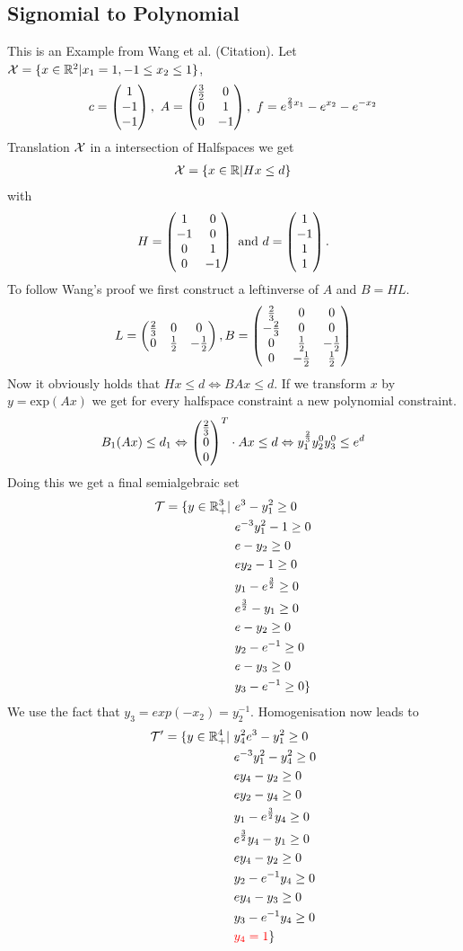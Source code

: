 \documentclass[./main.tex]{subfiles}
\begin{document}
\subsection{Signomial to Polynomial}
This is an Example from Wang et al. (Citation). Let $\mathcal X = \lbrace x \in \mathbb{R}^2 | x_1 = 1, -1\leq x_2 \leq 1 \rbrace$, 
\begin{equation*}
c = \begin{pmatrix}1\\-1\\-1\end{pmatrix}, \ A =  \begin{pmatrix} \frac 3 2 & 0 \\ 0 & 1 \\ 0 & -1 \end{pmatrix}, \ f=e^{\frac 2 3 x_1} - e^{x_2} - e^{-x_2}
\end{equation*}
Translation $\mathcal{X}$ in a intersection of Halfspaces we get
\begin{align*}
\mathcal{X} = \lbrace x \in \mathbb{R} \vert Hx \leq d \rbrace
\end{align*}
with
\begin{align*}
H =  \begin{pmatrix} 1 & 0 \\ -1 & 0 \\ 0 & 1 \\ 0 & -1 \end{pmatrix} \text{ and } d = \begin{pmatrix}1\\-1\\1\\1\end{pmatrix}.
\end{align*}
To follow Wang's proof we first construct a leftinverse of $A$ and $B=HL$.
\begin{align*}
L = \begin{pmatrix} \frac 2 3 & 0 & 0 \\ 0 & \frac 1 2 & -\frac 1 2 \\ \end{pmatrix}, B = \begin{pmatrix} \frac 2 3 & 0 & 0 \\ -\frac 2 3 & 0 & 0 \\ 0 & \frac 1 2 & -\frac 1 2 \\ 0 & -\frac 1 2 & \frac 1 2 \\ \end{pmatrix}
\end{align*}
Now it obviously holds that $Hx \leq d  \Leftrightarrow BAx \leq d$. If we transform $x$ by $y=\text{exp}(Ax)$ we get for every halfspace constraint a new polynomial constraint.
\begin{align*}
B_1(Ax) \leq d_1 \Leftrightarrow  \begin{pmatrix}\frac 2 3\\0\\0\end{pmatrix}^T  \cdot Ax \leq d \Leftrightarrow y_1^{\frac 2 3}y_2^0y_3^0 \leq e^d
\end{align*}
Doing this we get a final semialgebraic set
\begin{align*}
\mathcal{T} = \lbrace y \in \mathbb{R}^3_+ \vert \ & e^3 - y_1^2 \geq 0 \\
& e^{-3}y_1^2 -1 \geq 0 \\
& e - y_2 \geq 0\\
& ey_2 - 1 \geq 0 \\
& y_1 - e^{\frac 3 2} \geq 0 \\
& e^{\frac 3 2} - y_1 \geq 0 \\
&e- y_2 \geq 0 \\
&y_2 -e^{-1}  \geq 0 \\
&e- y_3 \geq 0 \\
&y_3 -e^{-1}  \geq 0 \rbrace
\end{align*}
We use the fact that $y_3 = exp(-x_2) = y_2^{-1}.$ Homogenisation now leads to
\begin{align*}
\mathcal{T}' = \lbrace y \in \mathbb{R}^4_+ \vert \ & y_4^2e^3 - y_1^2 \geq 0 \\
& e^{-3}y_1^2 -y_4^2 \geq 0 \\
& ey_4 - y_2 \geq 0\\
& ey_2 - y_4 \geq 0 \\
& y_1 - e^{\frac 3 2}y_4 \geq 0 \\
& e^{\frac 3 2}y_4 - y_1 \geq 0 \\
&ey_4- y_2 \geq 0 \\
&y_2 -e^{-1}y_4  \geq 0 \\
&ey_4- y_3 \geq 0 \\
&y_3 -e^{-1}y_4  \geq 0 \\
&\textcolor{red}{y_4 =  1} \rbrace
\end{align*}
\end{document}
